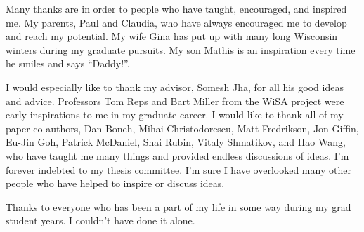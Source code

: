 
Many thanks are in order to people who have taught, encouraged, and
inspired me. My parents, Paul and Claudia, who have always encouraged
me to develop and reach my potential. My wife Gina has put up with
many long Wisconsin winters during my graduate pursuits. My son Mathis
is an inspiration every time he smiles and says {}``Daddy!''.

I would especially like to thank my advisor, Somesh Jha, for all his
good ideas and advice. Professors Tom Reps and Bart Miller from the
WiSA project were early inspirations to me in my graduate career.
I would like to thank all of my paper co-authors, Dan Boneh, Mihai
Christodorescu, Matt Fredrikson, Jon Giffin, Eu-Jin Goh, Patrick McDaniel,
Shai Rubin, Vitaly Shmatikov, and Hao Wang, who have taught
me many things and provided endless discussions of ideas. I'm forever indebted to
my thesis committee.
I'm sure I have overlooked many other people who have helped to inspire
or discuss ideas.

Thanks to everyone who has been a part of my life in some way during
my grad student years. I couldn't have done it alone.
